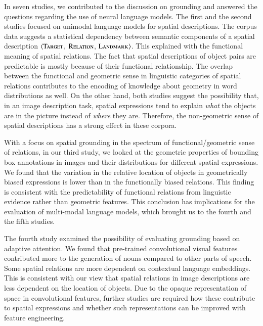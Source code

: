 In seven studies, we %
contributed
to the discussion on grounding and 
answered the
questions regarding the use of neural language models. The first \citep{dobnik-etal-2018-exploring} and the second \citep{ghanimifard-dobnik-2019-neural} studies focused on unimodal language models for spatial descriptions. The corpus data suggests a statistical dependency between semantic components of a spatial description $\langle\textsc{Target}$, $\textsc{Relation}$, $\textsc{Landmark}\rangle$.
This %
explained with the functional meaning of spatial relations. 
The fact that %
spatial descriptions of object pairs are predictable is mostly because of their functional relationship. 
The overlap between the functional and geometric sense in linguistic categories of spatial relations %
contributes to the encoding of knowledge about geometry in word distributions as well. 
On the other hand, both
studies suggest the possibility that, in an image description task, spatial expressions tend to explain \emph{what} the objects are in the picture instead of \emph{where} they are. 
Therefore, the non-geometric sense of spatial descriptions has a strong
effect in these corpora. 

With a 
focus on
spatial grounding in the spectrum of functional/geometric sense of relations, in our third study, we looked at the geometric properties of bounding box annotations in images and their distributions 
for different
spatial expressions. 
We found that the variation in the relative location of objects in geometrically biased expressions is lower than 
in the functionally biased relations.
This finding is consistent with the predictability of functional relations from linguistic evidence 
rather than geometric 
features.
This conclusion has implications for the evaluation of multi-modal language models, which brought us to the fourth and the fifth studies.

The fourth study \citep{ghanimifard2018knowing} examined the possibility of evaluating grounding based on adaptive attention. We found that pre-trained convolutional visual features contributed more to the generation of nouns compared to other parts of speech. Some spatial relations are more dependent on contextual language embeddings. This is consistent with our view that spatial relations in image descriptions are less dependent on the 
location of objects. 
Due to the opaque representation of space in convolutional features,
further studies are required how these contribute to spatial expressions and whether such representations can be improved with feature engineering.
 

